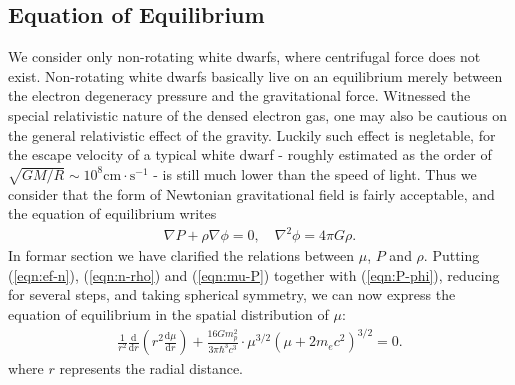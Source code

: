 \documentclass[a4paper,11pt]{article}
\newcommand{\mathdd}{\mathrm{d}}
\numberwithin{equation}{section}
\numberwithin{table}{section}
\numberwithin{figure}{section}
\begin{document}
		\subsection{Equation of Equilibrium}
		
			We consider only non-rotating white dwarfs, where centrifugal force does not exist. Non-rotating white dwarfs basically live on an equilibrium merely between the electron degeneracy pressure and the gravitational force. Witnessed the special relativistic nature of the densed electron gas, one may also be cautious on the general relativistic effect of the gravity. Luckily such effect is negletable, for the escape velocity of a typical white dwarf - roughly estimated as the order of $\sqrt{GM/R}\sim 10^8\mathrm{cm\cdot s^{-1}}$ - is still much lower than the speed of light\cite{schultz2009GR}. Thus we consider that the form of Newtonian gravitational field is fairly acceptable, and the equation of equilibrium writes
			\begin{align}
				\nabla P+\rho\nabla\phi=0, \quad
				\nabla^2\phi=4\pi G\rho.
				\label{eqn:P-phi}
			\end{align}
			In formar section we have clarified the relations between $\mu$, $P$ and $\rho$. Putting (\ref{eqn:ef-n}), (\ref{eqn:n-rho}) and (\ref{eqn:mu-P}) together with (\ref{eqn:P-phi}), reducing for several steps, and taking spherical symmetry, we can now express the equation of equilibrium in the spatial distribution of $\mu$: 
			\begin{align}
				\frac{1}{r^2}\frac{\mathdd}{\mathdd r}
					\left(r^2\frac{\mathdd\mu}{\mathdd r}\right)
					+\frac{16Gm_p^2}{3\pi\hbar^3c^3}
					\cdot\mu^{3/2}(\mu+2m_ec^2)^{3/2}=0.
				\label{eqn:mu_eq}
			\end{align}
			where $r$ represents the radial distance. 
			
\end{document}
